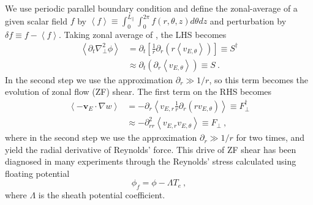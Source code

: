 \documentclass[aps,pre,twocolumn,superscriptaddress]{revtex4-1}
\begin{document}
We use periodic parallel boundary condition and define the zonal-average of a given scalar field $f$ by $\left<f\right>\equiv\int_{0}^{L_{\parallel}}\int_{0}^{2\pi}f
\left(r,\theta,z\right)d\theta dz$ and perturbation by $\delta f\equiv f-\left<f\right>$. Taking zonal average of , the LHS becomes
\begin{equation}
\begin{aligned}
	\left<\partial_{t}\nabla_{\perp}^{2}\phi\right>
&=\partial_{t}\left[\frac{1}{r}\partial_{r}
\left(r\left<v_{E,\theta}\right>\right)\right]\equiv S^{\dagger} \\
&\approx\partial_{t}\left(\partial_{r}\left<v_{E,\theta}\right>\right)\equiv S~.
\label{eq:S}
\end{aligned}
\end{equation}
In the second step we use the approximation $\partial_{r}\gg 1/r$, so this term becomes the evolution of zonal flow (ZF) shear. The first term on the RHS becomes 
\begin{equation}
\begin{aligned}
	\left<-\bm{v}_{E}\cdot\nabla w\right>
	&=-\partial_{r}\left<v_{E,r}\frac{1}{r}\partial_{r}
	\left(rv_{E,\theta}\right)\right>\equiv F_{\perp}^{\dagger} \\
	&\approx-\partial_{rr}^{2}\left<v_{E,r}v_{E,\theta}\right>\equiv F_{\perp}~,
\label{eq:Fperp}
\end{aligned}
\end{equation}
where in the second step we use the approximation $\partial_{r}\gg 1/r$ for two times, and yield the radial derivative of Reynolds' force. This drive of ZF shear has been diagnosed in many experiments \cite{doi:10.1063/1.2985836,PhysRevLett.96.195002,PhysRevLett.104.065002} through the Reynolds' stress calculated using floating potential 
\begin{equation}
	\phi_{f}=\phi-\Lambda T_{e}~,
\label{eq:phif}
\end{equation}
where $\Lambda$ is the sheath potential coefficient.
\end{document}
